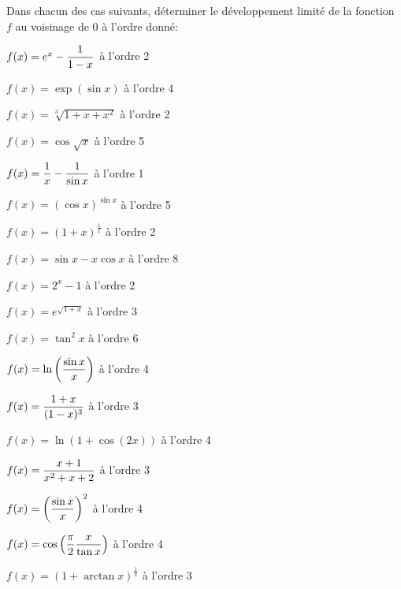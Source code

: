 \documentclass[a4paper, 11pt,reqno]{article}
\begin{document}
\begin{exercice}  \;
	Dans chacun des cas suivants, d\'eterminer le d\'eveloppement limit\'e de la fonction $f$ au voisinage de 0 \`a l'ordre donn\'e:
	\begin{enumerate}
		\begin{minipage}[t]{0.45\textwidth}
			\item $f(x)=e^x-\displaystyle\frac{1}{1-x}$ \`a l'ordre 2\vsec
			\item $f(x)=\exp{(\sin{x})}$ \`a l'ordre 4\vsec
			\item $f(x)=\sqrt[3]{1+x+x^2}$ \`a l'ordre 2\vsec
			\item $f(x)=\cos{\sqrt{x}}$ \`a l'ordre 5\vsec
			\item $f(x)=\displaystyle\frac{1}{x}-\displaystyle\frac{1}{\sin{x}}$ \`a l'ordre 1\vsec
			\item $f(x)=(\cos{x})^{\sin{x}}$ \`a l'ordre 5\vsec
			\item $f(x)=(1+x)^{\frac{1}{x}}$ \`a l'ordre 2\vsec
			\item $f(x)=\sin{x}-x\cos{x}$ \`a l'ordre 8\vsec
			\item $f(x)=2^x-1$ \`a l'ordre 2 \vsec
			\item $f(x)=e^{\sqrt{1+x}}$ \`a l'ordre 3\vsec
		\end{minipage}
		\quad
		\begin{minipage}[t]{0.45\textwidth}
			\item $f(x)=\tan^2{x}$ \`a l'ordre 6\vsec
			\item $f(x)=\ln{\left( \displaystyle\frac{\sin{x}}{x} \right)}$ \`a l'ordre 4\vsec
			\item $f(x)=\displaystyle\frac{1+x}{(1-x)^3}$ \`a l'ordre 3\vsec
			\item $f(x)=\ln{(1+\cos{(2x)})}$ \`a l'ordre 4\vsec
			\item $f(x)=\displaystyle\frac{x+1}{x^2+x+2}$ \`a l'ordre 3\vsec
			\item $f(x)=\left(\displaystyle\frac{\sin{x}}{x}  \right)^2$ \`a l'ordre 4\vsec
			\item $f(x)=\cos{\left( \displaystyle\frac{\pi}{2}\displaystyle\frac{x}{\tan{x}} \right)}$ \`a l'ordre 4\vsec
			\item $f(x)=\left(1+\arctan{x}\right)^{\frac{1}{x}}$ \`a l'ordre 3\vsec
		\end{minipage}
	\end{enumerate}
\end{exercice}
\end{document}
